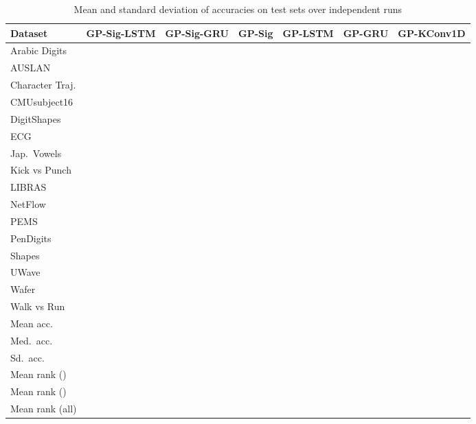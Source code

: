\documentclass{article}
\begin{document}
\begin{table*}[h]
	\caption{Mean and standard deviation of accuracies on test sets over  independent runs}
	\label{table:full_acc_results}
	\vskip 0.15in
	\begin{center}
		\begin{small}
			\begin{sc}
				\begin{tabular}{lcccccc}\toprule
					Dataset & GP-Sig-LSTM & GP-Sig-GRU & GP-Sig & GP-LSTM  & GP-GRU & GP-KConv1D\\
					\midrule 
                        Arabic Digits &  &  &  &  &  &  \\ 
                        AUSLAN &  &  &  &  &  &  \\ 
                        Character Traj. &  &  &  &  &  &  \\ 
                        CMUsubject16 &  &  &  &  &  &  \\ 
                        DigitShapes &  &  &  &  &  &  \\ 
                        ECG &  &  &  &  &  &  \\ 
                        Jap.~Vowels &  &  &  &  &  &  \\ 
                        Kick vs Punch &  &  &  &  &  &  \\ 
                        LIBRAS &  &  &  &  &  &  \\ 
                        NetFlow &  &  &  &  &  &  \\ 
                        PEMS &  &  &  &  &  &  \\ 
                        PenDigits &  &  &  &  &  &  \\ 
                        Shapes &  &  &  &  &  &  \\ 
                        UWave &  &  &  &  &  &  \\ 
                        Wafer &  &  &  &  &  &  \\ 
                        Walk vs Run &  &  &  &  &  &  \\
                        \midrule
                        Mean acc. &  &  &  &  &  &  \\
                        Med.~acc. &  &  &  &  &  &  \\
                        Sd.~acc. &  &  &  &  &  &  \\
                        \midrule
                        Mean rank () &  &  &  &  &  &  \\ 
                        Mean rank () &  &  &  &  &  &  \\ 
                        Mean rank (all) &  &  &  &  &  &  \\
					\bottomrule
				\end{tabular}
			\end{sc}
		\end{small}
	\end{center}
\end{table*}
\end{document}
